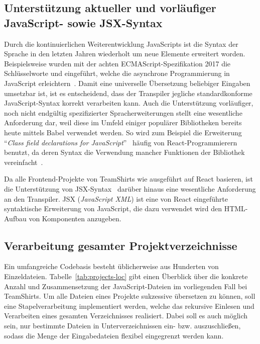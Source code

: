 \subsection{Unterstützung aktueller und vorläufiger JavaScript- sowie JSX-Syntax}
\label{subsec:requirement:syntax}

Durch die kontinuierlichen Weiterentwicklung JavaScripts ist die Syntax der Sprache in den letzten Jahren wiederholt um neue Elemente erweitert worden. Beispielsweise wurden mit der achten ECMAScript-Spezifikation 2017 die Schlüsselworte  und  eingeführt, welche die asynchrone Programmierung in JavaScript erleichtern~\autocite[430]{ECMASCRIPT:2017}. Damit eine universelle Übersetzung beliebiger Eingaben umsetzbar ist, ist es entscheidend, dass der Transpiler jegliche standardkonforme JavaScript-Syntax korrekt verarbeiten kann. Auch die Unterstützung vorläufiger, noch nicht endgültig spezifizierter Spracherweiterungen stellt eine wesentliche Anforderung dar, weil diese im Umfeld einiger populärer Bibliotheken bereits heute mittels Babel verwendet werden. So wird zum Beispiel die Erweiterung \enquote{\textit{Class field declarations for JavaScript}}~\autocite{ES_PROPOSAL:CLASS_FIELDS} häufig von React-Programmierern benutzt, da deren Syntax die Verwendung mancher Funktionen der Bibliothek vereinfacht~\autocite{REACT:HANDLING_EVENTS}.

Da alle Frontend-Projekte von TeamShirts wie ausgeführt auf React basieren, ist die Unterstützung von JSX-Syntax~\autocite{SOFTWARE:JSX} darüber hinaus eine wesentliche Anforderung an den Transpiler. JSX (\textit{JavaScript XML}) ist eine von React eingeführte syntaktische Erweiterung von JavaScript, die dazu verwendet wird den HTML-Aufbau von Komponenten anzugeben.

\subsection{Verarbeitung gesamter Projektverzeichnisse}
\label{subsec:requirement:batch-processing}

Ein umfangreiche Codebasis besteht üblicherweise aus Hunderten von Einzeldateien. Tabelle~\ref{tab:projects-loc} gibt einen Überblick über die konkrete Anzahl und Zusammensetzung der JavaScript-Dateien im vorliegenden Fall bei TeamShirts. Um alle Dateien eines Projekte sukzessive übersetzen zu können, soll eine Stapelverarbeitung implementiert werden, welche das rekursive Einlesen und Verarbeiten eines gesamten Verzeichnisses realisiert. Dabei soll es auch möglich sein, nur bestimmte Dateien in Unterverzeichnissen ein- bzw. auszuschließen, sodass die Menge der Eingabedateien flexibel eingegrenzt werden kann.

